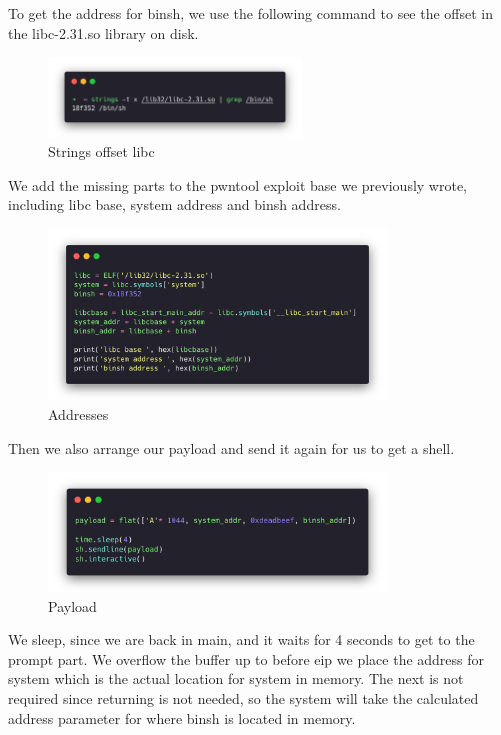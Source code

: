 To get the address for binsh, we use the following command to see the offset in
the libc-2.31.so library on disk.

\begin{figure}[H]
  \centering
  \includegraphics[width=0.6\textwidth]{figures/strings-t}
  \caption{Strings offset libc}
  \label{f:strings-t}
\end{figure}

We add the missing parts to the pwntool exploit base we previously wrote,
including libc base, system address and binsh address.

\begin{figure}[H]
  \centering
  \includegraphics[width=0.8\textwidth]{figures/addresses}
  \caption{Addresses}
  \label{f:addresses}
\end{figure}

Then we also arrange our payload and send it again for us to get a shell.

\begin{figure}[H]
  \centering
  \includegraphics[width=0.8\textwidth]{figures/payload}
  \caption{Payload}
  \label{f:payload}
\end{figure}

We sleep, since we are back in main, and it waits for 4 seconds to get to the
prompt part. We overflow the buffer up to before eip we place the address for
system which is the actual location for system in memory. The next is not
required since returning is not needed, so the system will take the calculated
address parameter for where binsh is located in memory.

